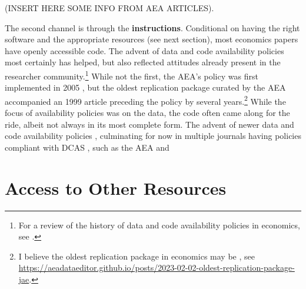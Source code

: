 \documentclass{article}
\begin{document}
{(INSERT HERE SOME INFO FROM AEA ARTICLES). 


The second channel is through the \textbf{instructions}. Conditional on having the right software and the appropriate resources (see next section), most economics papers have openly accessible code. The advent of data and code availability policies most certainly has helped, but also reflected attitudes already present in the researcher community.\footnote{For a review of the history of data and code availability policies in economics, see \citet{vlaeminck_dawning_2021}.} While not the first, the AEA's policy was first implemented in 2005 \citep{bernanke_editorial_2004,american_economic_association_data_2005}, but the oldest replication package curated by the AEA accompanied an 1999 article \citep{frankel_does_1999,frankel_replication_1999} preceding the policy by several years.\footnote{I believe the oldest replication package in economics may be \citet{koenker_asymptotic_1988-1}, see \url{https://aeadataeditor.github.io/posts/2023-02-02-oldest-replication-package-jae}.} While the focus of availability policies was on the data, the code often came along for the ride, albeit not always in its most complete form. The advent of newer data and code availability policies \citep[for the AEA, ][]{AEA-announcement-July-2019,AEA-announcement-July-2019}, culminating for now in multiple journals having policies compliant with \ac{DCAS} \citep{koren_data_2022}, such as the AEA \citep{american_economic_association_data_2024} and




%


\section{Access to Other Resources}
\label{sec:other_resources}

}
\end{document}
